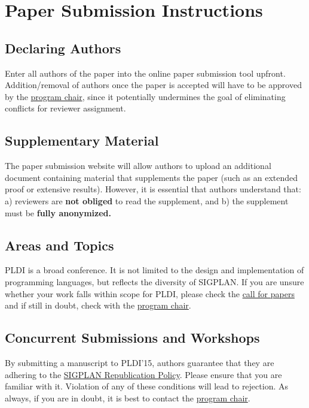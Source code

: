 \documentclass[pldi]{sigplanconf-pldi15}
\begin{document}
\section{Paper Submission Instructions}

\subsection{Declaring Authors}

Enter all authors of the paper into the online paper submission tool
upfront. Addition/removal of authors once the paper is accepted will
have to be approved by the \href{mailto:emery@cs.umass.edu?subject=[PLDI'15]}{program chair}, since it potentially
undermines the goal of eliminating conflicts for reviewer assignment.

\subsection{Supplementary Material}

The paper submission website will allow authors to upload an
additional document containing material that supplements the paper
(such as an extended proof or extensive results).  However, it is
essential that authors understand that: a) reviewers are \textbf{not
  obliged} to read the supplement, and b) the supplement must
  be \textbf{fully anonymized.}

\subsection{Areas and Topics}

PLDI is a broad conference.  It is not limited to the design and
implementation of programming languages, but reflects the diversity of
SIGPLAN.  If you are unsure whether your work falls
within scope for PLDI, please check the
\href{http://conf.researchr.org/track/pldi2015/pldi2015-papers#Call-for-Papers}{call
  for papers} and if still in doubt, check with the
\href{mailto:emery@cs.umass.edu?subject=[PLDI'15]}{program
  chair}.

\subsection{Concurrent Submissions and Workshops}

By submitting a manuscript to PLDI'15, authors guarantee that they
are adhering to the
\href{http://www.sigplan.org/Resources/Policies/Republication/}{SIGPLAN
  Republication Policy}. Please ensure that you are familiar with it.
Violation of any of these conditions will lead to rejection.
As always, if you are in doubt, it is best to contact the
\href{mailto:emery@cs.umass.edu?subject=[PLDI'15]}{program
  chair}.
\end{document}
